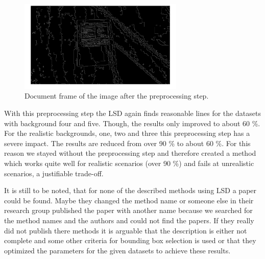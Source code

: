 \documentclass[english, paper=a4]{scrartcl}
\begin{document}
\begin{figure}[h]
	\centering
	\includegraphics[width=0.7\textwidth]{pre.png}
	\caption{Document frame of the image after the preprocessing step.}
	\label{fig:pre}
\end{figure}

With this preprocessing step the LSD again finds reasonable lines for the datasets
with background four and five. Though, the results only improved to about 60 \%.
For the realistic backgrounds, one, two and three this preprocessing step has a severe impact. 
The results are reduced from over 90 \% to about 60 \%. 
For this reason we stayed without the preprocessing step and 
therefore created a method which works quite well for realistic scenarios
(over 90 \%) and fails at unrealistic scenarios, a justifiable trade-off.

It is still to be noted, that for none of the described methods using LSD
a paper could be found. Maybe they changed the method name or someone else
in their research group published the paper with another name
because we searched for the method names and the authors and could not find the papers.
If they really did not publish there methods it is arguable that 
the description is either not complete and some other
criteria for bounding box selection is used or that they optimized
the parameters for the given datasets to achieve these results.

\newpage


\end{document}
